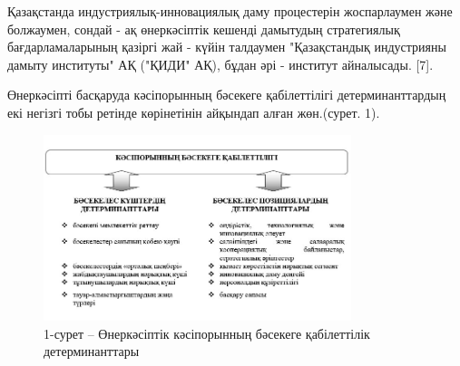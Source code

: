 \begin{multicols}{2}
Қазақстанда индустриялық-инновациялық даму процестерін жоспарлаумен және
болжаумен, сондай - ақ өнеркәсіптік кешенді дамытудың стратегиялық
бағдарламаларының қазіргі жай - күйін талдаумен "Қазақстандық
индустрияны дамыту институты" АҚ ("ҚИДИ" АҚ), бұдан әрі - институт
айналысады. {[}7{]}.

Өнеркәсіпті басқаруда кәсіпорынның бәсекеге қабілеттілігі
детерминанттардың екі негізгі тобы ретінде көрінетінін айқындап алған
жөн.(сурет. 1).
\end{multicols}


\begin{figure}[H]
	\centering
	\includegraphics[width=0.8\textwidth]{media/ekon/image1.1}
	\caption*{1-сурет -- Өнеркәсіптік кәсіпорынның бәсекеге қабілеттілік
	детерминанттары}
\end{figure}

